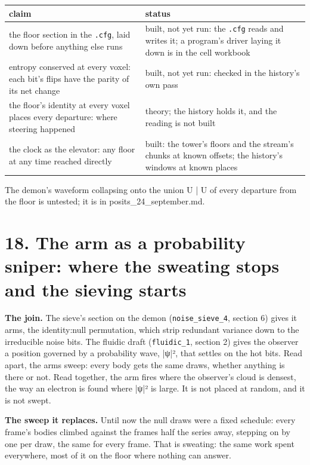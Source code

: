 {\small
\setlength{\tabcolsep}{6pt}
\begin{longtable}{>{\RaggedRight\arraybackslash}p{}>{\RaggedRight\arraybackslash}p{}}
\toprule
claim & status \\
\midrule
\endhead
the floor section in the \texttt{.\allowbreak{}cfg}, laid down before anything else runs & built, not yet run: the \texttt{.\allowbreak{}cfg} reads and writes it; a program's driver laying it down is in the cell workbook \\
entropy conserved at every voxel: each bit's flips have the parity of its net change & built, not yet run: checked in the history's own pass \\
the floor's identity at every voxel places every departure: where steering happened & theory; the history holds it, and the reading is not built \\
the clock as the elevator: any floor at any time reached directly & built: the tower's floors and the stream's chunks at known offsets; the history's windows at known places \\
\bottomrule
\end{longtable}
}

The demon's waveform collapsing onto the union U | U of every departure from the floor is untested; it is in posits\_\allowbreak{}24\_\allowbreak{}september.md.

\section{\texorpdfstring{18. The arm as a probability sniper: where the sweating stops and the sieving starts}{18. The arm as a probability sniper: where the sweating stops and the sieving starts}}

\textbf{The join.} The sieve's section on the demon (\texttt{noise\_\allowbreak{}sieve\_\allowbreak{}4}, section 6) gives it arms, the identity:null permutation, which strip redundant variance down to the irreducible noise bits. The fluidic draft (\texttt{fluidic\_\allowbreak{}1}, section 2) gives the observer a position governed by a probability wave, |ψ|², that settles on the hot bits. Read apart, the arms sweep: every body gets the same draws, whether anything is there or not. Read together, the arm fires where the observer's cloud is densest, the way an electron is found where |ψ|² is large. It is not placed at random, and it is not swept.

\textbf{The sweep it replaces.} Until now the null draws were a fixed schedule: every frame's bodies climbed against the frames half the series away, stepping on by one per draw, the same for every frame. That is sweating: the same work spent everywhere, most of it on the floor where nothing can answer.

